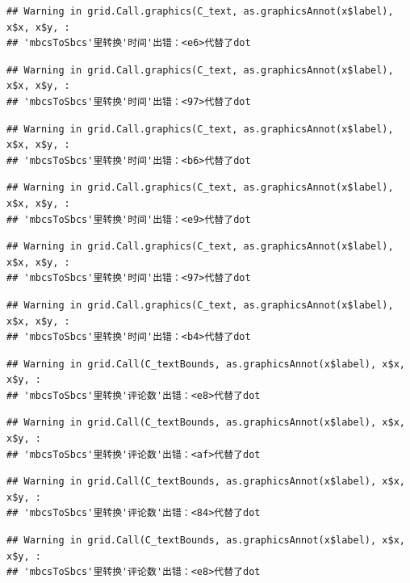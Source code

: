 \documentclass[
]{article}
\begin{document}
\begin{verbatim}
## Warning in grid.Call.graphics(C_text, as.graphicsAnnot(x$label), x$x, x$y, :
## 'mbcsToSbcs'里转换'时间'出错：<e6>代替了dot
\end{verbatim}

\begin{verbatim}
## Warning in grid.Call.graphics(C_text, as.graphicsAnnot(x$label), x$x, x$y, :
## 'mbcsToSbcs'里转换'时间'出错：<97>代替了dot
\end{verbatim}

\begin{verbatim}
## Warning in grid.Call.graphics(C_text, as.graphicsAnnot(x$label), x$x, x$y, :
## 'mbcsToSbcs'里转换'时间'出错：<b6>代替了dot
\end{verbatim}

\begin{verbatim}
## Warning in grid.Call.graphics(C_text, as.graphicsAnnot(x$label), x$x, x$y, :
## 'mbcsToSbcs'里转换'时间'出错：<e9>代替了dot
\end{verbatim}

\begin{verbatim}
## Warning in grid.Call.graphics(C_text, as.graphicsAnnot(x$label), x$x, x$y, :
## 'mbcsToSbcs'里转换'时间'出错：<97>代替了dot
\end{verbatim}

\begin{verbatim}
## Warning in grid.Call.graphics(C_text, as.graphicsAnnot(x$label), x$x, x$y, :
## 'mbcsToSbcs'里转换'时间'出错：<b4>代替了dot
\end{verbatim}

\begin{verbatim}
## Warning in grid.Call(C_textBounds, as.graphicsAnnot(x$label), x$x, x$y, :
## 'mbcsToSbcs'里转换'评论数'出错：<e8>代替了dot
\end{verbatim}

\begin{verbatim}
## Warning in grid.Call(C_textBounds, as.graphicsAnnot(x$label), x$x, x$y, :
## 'mbcsToSbcs'里转换'评论数'出错：<af>代替了dot
\end{verbatim}

\begin{verbatim}
## Warning in grid.Call(C_textBounds, as.graphicsAnnot(x$label), x$x, x$y, :
## 'mbcsToSbcs'里转换'评论数'出错：<84>代替了dot
\end{verbatim}

\begin{verbatim}
## Warning in grid.Call(C_textBounds, as.graphicsAnnot(x$label), x$x, x$y, :
## 'mbcsToSbcs'里转换'评论数'出错：<e8>代替了dot
\end{verbatim}
\end{document}
